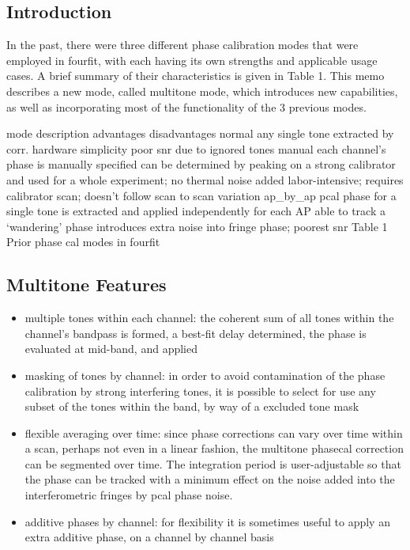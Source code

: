 \subsection{Introduction}

In the past, there were three different phase calibration modes that were employed in fourfit, with each having its own strengths and applicable usage cases. A brief summary of their characteristics is given in Table 1.  This memo describes a new mode, called multitone mode, which introduces new capabilities, as well as incorporating most of the functionality of the 3 previous modes.


mode
description
advantages
disadvantages
normal
any single tone extracted by corr. hardware
simplicity
poor snr due to ignored tones
manual
each channel's phase is manually specified
can be determined by peaking on a strong calibrator and used for a whole experiment; no thermal noise added
labor-intensive; requires calibrator scan; doesn't follow scan to scan variation
ap\_by\_ap
pcal phase for a single tone is extracted and applied independently for each AP
able to track a `wandering' phase
introduces extra noise into fringe phase; poorest snr
Table 1 Prior phase cal modes in fourfit


\subsection{Multitone Features}
\begin{itemize}
\item{multiple tones within each channel}: the coherent sum of all tones within the channel's bandpass is formed, a best-fit delay determined, the phase is evaluated at mid-band, and applied
\item{masking of tones by channel}: in order to avoid contamination of the phase calibration by strong interfering tones, it is possible to select for use any subset of the tones within the band, by way of a  excluded tone mask
\item{flexible averaging over time}: since phase corrections can vary over time within a scan, perhaps not even in a linear fashion, the multitone phasecal correction can be segmented over time. The integration period is user-adjustable so that the phase can be tracked with a minimum effect on the noise added into the interferometric fringes by pcal phase noise.
\item{additive phases by channel}: for flexibility it is sometimes useful to apply an extra additive phase, on a channel by channel basis
\end{itemize}

